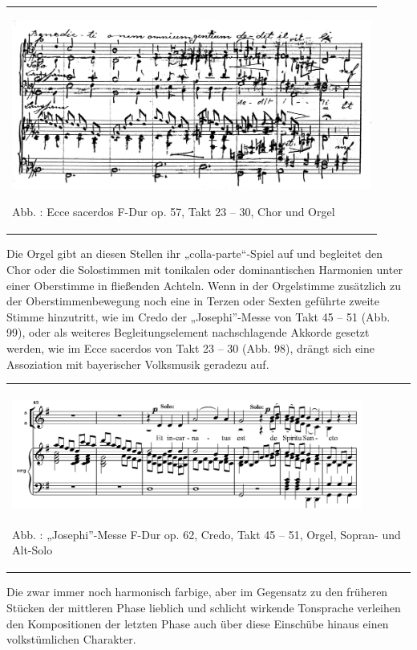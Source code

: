\documentclass[a4paper]{article}
\newcounter{Abb}
\renewcommand\theAbb{\arabic{Abb}}
\begin{document}
\begin{center}
\tablefirsthead{}
\tablehead{}
\tabletail{}
\tablelasttail{}
\begin{supertabular}{m{12.034cm}}

\includegraphics[width=11.852cm,height=5.583cm]{pictures/zulassungsarbeit-img100.png}

\label{bkm:Ref99948828}Abb. \stepcounter{Abb}{\theAbb}: Ecce sacerdos
F-Dur op. 57, Takt 23 – 30, Chor und Orgel\\
\end{supertabular}
\end{center}
Die Orgel gibt an diesen Stellen ihr „colla-parte“-Spiel auf und
begleitet den Chor \newline
oder die Solostimmen mit tonikalen oder dominantischen Harmonien unter
einer \newline
Oberstimme in fließenden Achteln. Wenn in der Orgelstimme zusätzlich zu
der \newline
Oberstimmenbewegung noch eine in Terzen oder Sexten geführte zweite
Stimme hinzutritt, wie im Credo der „Josephi”-Messe von Takt 45 – 51
(Abb. 99), oder als weiteres Begleitungselement nachschlagende Akkorde
gesetzt werden, wie im Ecce sacerdos von Takt 23 – 30 (Abb. 98), drängt
sich eine Assoziation mit bayerischer Volksmusik geradezu auf.

\begin{center}
\tablefirsthead{}
\tablehead{}
\tabletail{}
\tablelasttail{}
\begin{supertabular}{m{11.729cm}}

\includegraphics[width=11.546cm,height=3.787cm]{pictures/zulassungsarbeit-img101.png}

\label{bkm:Ref99948855}Abb. \stepcounter{Abb}{\theAbb}: „Josephi”-Messe
F-Dur op. 62, Credo, Takt 45 – 51, Orgel, Sopran- und Alt-Solo\\
\end{supertabular}
\end{center}
Die zwar immer noch harmonisch farbige, aber im Gegensatz zu den
früheren Stücken der mittleren Phase lieblich und schlicht wirkende
Tonsprache verleihen den Kompositionen der letzten Phase auch über
diese Einschübe hinaus einen volkstümlichen Charakter.
\end{document}
